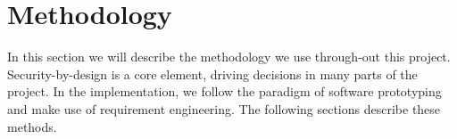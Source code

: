\section{Methodology}\label{sec:methodology}
% 
In this section we will describe the methodology we use through-out this project. Security-by-design is a core element, driving decisions in many parts of the project. In the implementation, we follow the paradigm of software prototyping and make use of requirement engineering. The following sections describe these methods.
% 

% 

% 
